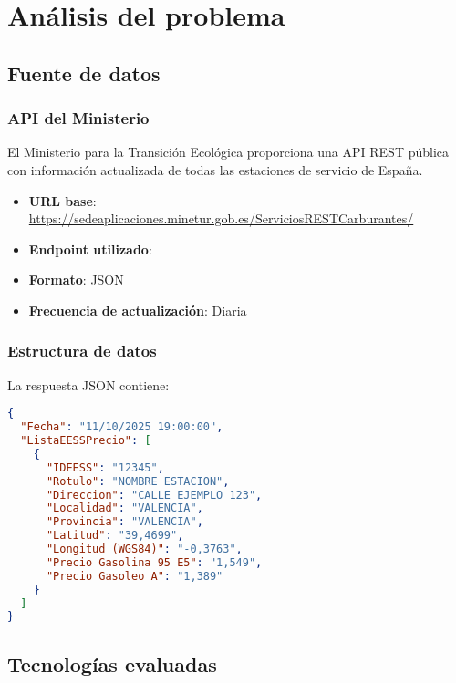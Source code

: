 \chapter{Análisis del problema}

\section{Fuente de datos}

\subsection{API del Ministerio}

El Ministerio para la Transición Ecológica proporciona una API REST pública con información actualizada de todas las estaciones de servicio de España.

\begin{itemize}
  \item \textbf{URL base}: \url{https://sedeaplicaciones.minetur.gob.es/ServiciosRESTCarburantes/}
  \item \textbf{Endpoint utilizado}: 
  \item \textbf{Formato}: JSON
  \item \textbf{Frecuencia de actualización}: Diaria
\end{itemize}

\subsection{Estructura de datos}

La respuesta JSON contiene:

\begin{lstlisting}[language=json,caption={Estructura de la respuesta JSON}]
{
  "Fecha": "11/10/2025 19:00:00",
  "ListaEESSPrecio": [
    {
      "IDEESS": "12345",
      "Rotulo": "NOMBRE ESTACION",
      "Direccion": "CALLE EJEMPLO 123",
      "Localidad": "VALENCIA",
      "Provincia": "VALENCIA",
      "Latitud": "39,4699",
      "Longitud (WGS84)": "-0,3763",
      "Precio Gasolina 95 E5": "1,549",
      "Precio Gasoleo A": "1,389"
    }
  ]
}
\end{lstlisting}

\section{Tecnologías evaluadas}

